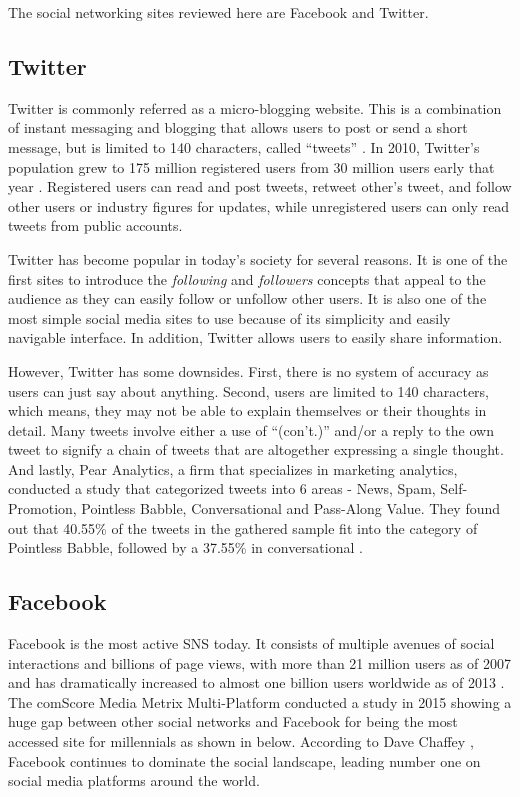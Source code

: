 The social networking sites reviewed here are Facebook and Twitter.

\subsection{Twitter}
Twitter is commonly referred as a micro-blogging website. This is a combination of instant messaging and blogging that allows users to post or send a short message, but is limited to 140 characters, called ``tweets'' \cite{Crymble2010}. In 2010, Twitter's population grew to 175 million registered users from 30 million users early that year \cite{Rao2010}. Registered users can read and post tweets, retweet other's tweet, and follow other users or industry figures for updates, while unregistered users can only read tweets from public accounts.

Twitter has become popular in today's society for several reasons. It is one of the first sites to introduce the \textit{following} and \textit{followers} concepts that appeal to the audience as they can easily follow or unfollow other users. It is also one of the most simple social media sites to use because of its simplicity and easily navigable interface. In addition, Twitter allows users to easily share information.

However, Twitter has some downsides. First, there is no system of accuracy as users can just say about anything. Second, users are limited to 140 characters, which means, they may not be able to explain themselves or their thoughts in detail. Many tweets involve either a use of  ``(con't.)'' and/or a reply to the own tweet to signify a chain of tweets that are altogether expressing a single thought. And lastly, Pear Analytics, a firm that specializes in marketing analytics, conducted a study that categorized tweets into 6 areas - News, Spam, Self-Promotion, Pointless Babble, Conversational and Pass-Along Value. They found out that 40.55\% of the tweets in the gathered sample fit into the category of Pointless Babble, followed by a 37.55\% in conversational \cite{PearAnalytics2009}.

\subsection{Facebook}
Facebook is the most active SNS today. It consists of multiple avenues of social interactions and billions of page views, with more than 21 million users as of 2007 \cite{EllisonSteinfieldLampe2007} and has dramatically increased to almost one billion users worldwide as of 2013 \cite{FarahbakhshHanCuevasCrespi2013}. The comScore Media Metrix Multi-Platform conducted a study in 2015 showing a huge gap between other social networks and Facebook for being the most accessed site for millennials as shown in  below. According to Dave Chaffey \citeyear{Chaffey2016}, Facebook continues to dominate the social landscape, leading number one on social media platforms around the world.

